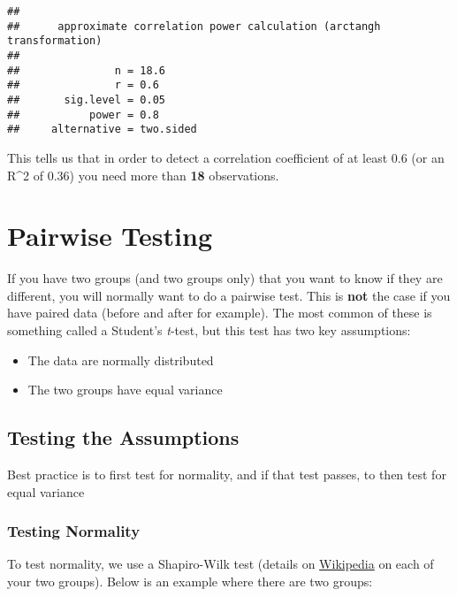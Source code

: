 \documentclass[
]{article}
\providecommand{\tightlist}{%
  \setlength{\itemsep}{0pt}\setlength{\parskip}{0pt}}
\begin{document}
\begin{verbatim}
## 
##      approximate correlation power calculation (arctangh transformation) 
## 
##               n = 18.6
##               r = 0.6
##       sig.level = 0.05
##           power = 0.8
##     alternative = two.sided
\end{verbatim}

This tells us that in order to detect a correlation coefficient of at
least 0.6 (or an R\^{}2 of 0.36) you need more than \textbf{18}
observations.

\section{Pairwise Testing}\label{pairwise-testing}

If you have two groups (and two groups only) that you want to know if
they are different, you will normally want to do a pairwise test. This
is \textbf{not} the case if you have paired data (before and after for
example). The most common of these is something called a Student's
\emph{t}-test, but this test has two key assumptions:

\begin{itemize}
\tightlist
\item
  The data are normally distributed
\item
  The two groups have equal variance
\end{itemize}

\subsection{Testing the Assumptions}\label{testing-the-assumptions}

Best practice is to first test for normality, and if that test passes,
to then test for equal variance

\subsubsection{Testing Normality}\label{testing-normality}

To test normality, we use a Shapiro-Wilk test (details on
\href{https://en.wikipedia.org/wiki/Shapiro\%E2\%80\%93Wilk_test}{Wikipedia}
on each of your two groups). Below is an example where there are two
groups:
\end{document}
